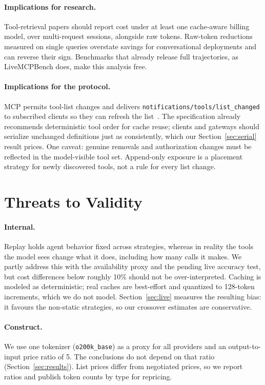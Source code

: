 \documentclass[11pt]{article}
\begin{document}
\paragraph{Implications for research.} Tool-retrieval papers should report cost under at least one cache-aware billing model, over multi-request sessions, alongside raw tokens. Raw-token reductions measured on single queries overstate savings for conversational deployments and can reverse their sign. Benchmarks that already release full trajectories, as LiveMCPBench does, make this analysis free.

\paragraph{Implications for the protocol.} MCP permits tool-list changes and delivers \texttt{notifications/tools/list\_changed} to subscribed clients so they can refresh the list~\cite{mcpspec}. The specification already recommends deterministic tool order for cache reuse; clients and gateways should serialize unchanged definitions just as consistently, which our Section~\ref{sec:serial} result prices. One caveat: genuine removals and authorization changes must be reflected in the model-visible tool set. Append-only exposure is a placement strategy for newly discovered tools, not a rule for every list change.

\section{Threats to Validity}
\paragraph{Internal.} Replay holds agent behavior fixed across strategies, whereas in reality the tools the model sees change what it does, including how many calls it makes. We partly address this with the availability proxy and the pending live accuracy test, but cost differences below roughly 10\% should not be over-interpreted. Caching is modeled as deterministic; real caches are best-effort and quantized to 128-token increments, which we do not model. Section~\ref{sec:live} measures the resulting bias: it favours the non-static strategies, so our crossover estimates are conservative.
\paragraph{Construct.} We use one tokenizer (\texttt{o200k\_base}) as a proxy for all providers and an output-to-input price ratio of 5. The conclusions do not depend on that ratio (Section~\ref{sec:results}). List prices differ from negotiated prices, so we report ratios and publish token counts by type for repricing.
\end{document}
